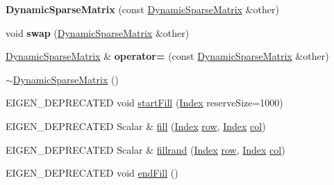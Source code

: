 \begin{DoxyCompactItemize}
\item 
\mbox{\label{class_eigen_1_1_dynamic_sparse_matrix_a61c416ffa2661d1d3db47d61c3a04bcf}} 
{\bfseries Dynamic\+Sparse\+Matrix} (const \hyperlink{class_eigen_1_1_dynamic_sparse_matrix}{Dynamic\+Sparse\+Matrix} \&other)
\item 
\mbox{\label{class_eigen_1_1_dynamic_sparse_matrix_a46c0e8a2c68d24eef495e833802a90b3}} 
void {\bfseries swap} (\hyperlink{class_eigen_1_1_dynamic_sparse_matrix}{Dynamic\+Sparse\+Matrix} \&other)
\item 
\mbox{\label{class_eigen_1_1_dynamic_sparse_matrix_a12fab494d7e774126fca5d0cd6e82851}} 
\hyperlink{class_eigen_1_1_dynamic_sparse_matrix}{Dynamic\+Sparse\+Matrix} \& {\bfseries operator=} (const \hyperlink{class_eigen_1_1_dynamic_sparse_matrix}{Dynamic\+Sparse\+Matrix} \&other)
\item 
\hyperlink{class_eigen_1_1_dynamic_sparse_matrix_af0677c8aec1e1dee9f0a389509082a83}{$\sim$\+Dynamic\+Sparse\+Matrix} ()
\item 
E\+I\+G\+E\+N\+\_\+\+D\+E\+P\+R\+E\+C\+A\+T\+ED void \hyperlink{class_eigen_1_1_dynamic_sparse_matrix_abade0bf46139d8577aa24ead30c76771}{start\+Fill} (\hyperlink{group___core___module_a554f30542cc2316add4b1ea0a492ff02}{Index} reserve\+Size=1000)
\item 
E\+I\+G\+E\+N\+\_\+\+D\+E\+P\+R\+E\+C\+A\+T\+ED Scalar \& \hyperlink{class_eigen_1_1_dynamic_sparse_matrix_a70c8f529b38fd5b7d93d6dfe1a122723}{fill} (\hyperlink{group___core___module_a554f30542cc2316add4b1ea0a492ff02}{Index} \hyperlink{group___sparse_core___module_ac0a5563ed3f243f013fb9d2c17e230d0}{row}, \hyperlink{group___core___module_a554f30542cc2316add4b1ea0a492ff02}{Index} \hyperlink{group___sparse_core___module_a8f4eaa3c3921ef3823ffc69ebcc356af}{col})
\item 
E\+I\+G\+E\+N\+\_\+\+D\+E\+P\+R\+E\+C\+A\+T\+ED Scalar \& \hyperlink{class_eigen_1_1_dynamic_sparse_matrix_a6a5eb3c9d153d8ebdf4e0967321108e2}{fillrand} (\hyperlink{group___core___module_a554f30542cc2316add4b1ea0a492ff02}{Index} \hyperlink{group___sparse_core___module_ac0a5563ed3f243f013fb9d2c17e230d0}{row}, \hyperlink{group___core___module_a554f30542cc2316add4b1ea0a492ff02}{Index} \hyperlink{group___sparse_core___module_a8f4eaa3c3921ef3823ffc69ebcc356af}{col})
\item 
E\+I\+G\+E\+N\+\_\+\+D\+E\+P\+R\+E\+C\+A\+T\+ED void \hyperlink{class_eigen_1_1_dynamic_sparse_matrix_aa806b3dde0a055844110610907b016f3}{end\+Fill} ()
\end{DoxyCompactItemize}

